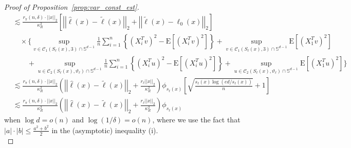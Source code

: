 \documentclass[ejsv2,noshowframe]{imsart}
\theoremstyle{plain}
\theoremstyle{definition}
\theoremstyle{remark}
\newcommand{\norm}[1]{\left|\left| #1 \right|\right|}
\renewcommand{\hat}{\widehat}
\renewcommand{\tilde}{\widetilde}
\begin{document}
\begin{proof}[Proof of Proposition~\ref{prop:var_const_est}]
\begin{align*}
		&\lesssim \frac{r_{\pi}(n,\delta) \cdot \norm{x}_2}{\kappa_R^2} \left[\norm{\hat{\ell}(x) -\tilde{\ell}(x)}_2 + \norm{\tilde{\ell}(x) -\ell_0(x)}_2 \right] \\
		&\quad \times \Biggl\{\sup_{v \in \mathcal{C}_1(S_{\ell}(x),3)\cap \mathbb{S}^{d-1}} \frac{1}{n}\sum_{i=1}^n \left\{\left(X_i^Tv \right)^2 - \mathrm{E}\left[\left(X_i^Tv \right)^2\right] \right\} + \sup_{v \in \mathcal{C}_1(S_{\ell}(x),3) \cap \mathbb{S}^{d-1}} \mathrm{E}\left[\left(X_1^Tv \right)^2\right] \\
		&\quad \quad + \sup_{u \in \mathcal{C}_2(S_{\ell}(x),\vartheta_{\ell})\cap \mathbb{S}^{d-1}} \frac{1}{n}\sum_{i=1}^n \left\{\left(X_i^Tu \right)^2 - \mathrm{E}\left[\left(X_i^Tu \right)^2\right] \right\} + \sup_{u \in \mathcal{C}_2(S_{\ell}(x),\vartheta_{\ell})\cap \mathbb{S}^{d-1}} \mathrm{E}\left[\left(X_1^Tu \right)^2\right] \Biggr\} \\
		&\lesssim \frac{r_{\pi}(n,\delta) \cdot \norm{x}_2}{\kappa_R^2} \left(\norm{\hat{\ell}(x) -\tilde{\ell}(x)}_2 + \frac{r_{\ell} \norm{x}_2}{\kappa_R^2} \right) \phi_{s_{\ell}(x)} \left[\sqrt{\frac{s_{\ell}(x)\log(ed/s_{\ell}(x))}{n}} + 1\right] \\
		&\lesssim \frac{r_{\pi}(n,\delta) \cdot \norm{x}_2}{\kappa_R^2} \left(\norm{\hat{\ell}(x) -\tilde{\ell}(x)}_2 + \frac{r_{\ell} \norm{x}_2}{\kappa_R^2} \right) \phi_{s_{\ell}(x)}
	\end{align*}
	when $\log d=o(n)$ and $\log(1/\delta)=o(n)$, where we use the fact that $|a|\cdot|b|\leq \frac{a^2+b^2}{2}$ in the (asymptotic) inequality (i). \\
	

\end{proof}
\end{document}

